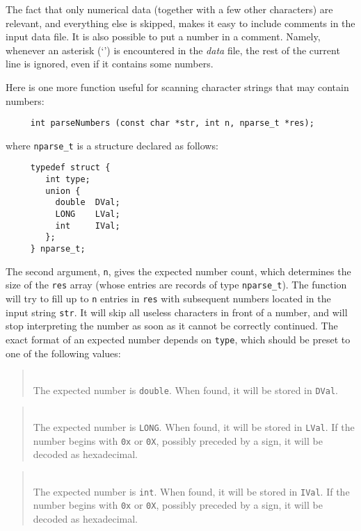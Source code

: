 The fact that only numerical data (together with a few other characters)
are relevant,
and everything else is skipped, makes it easy to include comments in the
input data file.
It is also possible to put a number in a comment.
Namely,
whenever an asterisk (`{\tt *}') is encountered in the {\em data\/} file,
the rest of the current line is ignored, even if
it contains some numbers.

Here is one more function useful for scanning character strings that may
contain numbers:
\begin{verbatim}
     int parseNumbers (const char *str, int n, nparse_t *res);
\end{verbatim}
\noindent
where {\tt nparse\_t} is a structure declared as follows:
\begin{verbatim}
     typedef struct {
        int type;
        union {
          double  DVal;
          LONG    LVal;
          int     IVal;
        };
     } nparse_t;
\end{verbatim}
The second argument, {\tt n}, gives the expected number count, which
determines the size of the {\tt res} array (whose entries are records of
type {\tt nparse\_t}).
The function will try to fill up to {\tt n} entries in {\tt res} with
subsequent numbers located in the input string {\tt str}.
It will skip all useless characters in front of a number, and will stop
interpreting the number as soon as it cannot be correctly continued.
The exact format of an expected number depends on {\tt type}, which should
be preset to one of the following values:

\begin{quote}
\noindent{}\\ \hspace{0in}
The expected number is {\tt double}.
When found, it will be stored in {\tt DVal}.
\end{quote}

\begin{quote}
\noindent{}\\ \hspace{0in}
The expected number is {\tt LONG}.
When found, it will be stored in {\tt LVal}.
If the number begins with {\tt 0x} or {\tt 0X}, possibly preceded by a
sign, it will be decoded as hexadecimal.
\end{quote}

\begin{quote}
\noindent{}\\ \hspace{0in}
The expected number is {\tt int}.
When found, it will be stored in {\tt IVal}.
If the number begins with {\tt 0x} or {\tt 0X}, possibly preceded by a
sign, it will be decoded as hexadecimal.
\end{quote}

